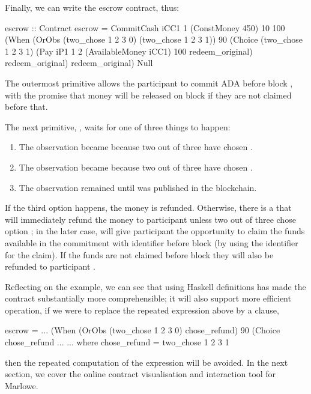 \documentclass[runningheads]{llncs}
\begin{document}
Finally, we can write the escrow contract, thus:
\begin{haskellcode}
escrow :: Contract
escrow = CommitCash iCC1 1 (ConstMoney 450) 10 100
                    (When (OrObs (two_chose 1 2 3 0)
                                 (two_chose 1 2 3 1))
                          90
                          (Choice (two_chose 1 2 3 1)
                                  (Pay iP1 1 2 (AvailableMoney iCC1) 100
                                       redeem_original)
                                  redeem_original)
                          redeem_original)
                    Null
\end{haskellcode}

The outermost primitive  allows the participant  to commit  ADA before 
block , with the promise that money will be released on block  if they are not claimed before that.

The next primitive, , waits for one of three things to happen:
\begin{enumerate}
	\item The observation became  because two out of three have chosen . 
	\item The observation became  because two out of three have chosen .
	\item The observation remained  until  was published in the blockchain.
\end{enumerate}

If the third option happens, the money is refunded. Otherwise, there is a  that will 
immediately refund the money to participant  unless two out of three chose option ; in the later 
case,  will give participant  the opportunity to claim the funds available in 
the commitment with identifier  before block  (by using the identifier  for 
the claim). If the funds are not claimed before block  they will also be refunded to 
participant .

Reflecting on the example, we can see that using Haskell definitions has made the contract substantially more 
comprehensible; it will also support more efficient operation, if we were to replace the repeated  expression 
 above by a  clause, 
\begin{haskellcode}
escrow = ...        (When (OrObs (two_chose 1 2 3 0)
                                 chose_refund)
                          90
                          (Choice chose_refund ...
                           ...
         where chose_refund = two_chose 1 2 3 1                 
\end{haskellcode}
then the repeated computation of the expression will be avoided.
In the next section, we cover the online contract visualisation and interaction tool for Marlowe.
\end{document}
